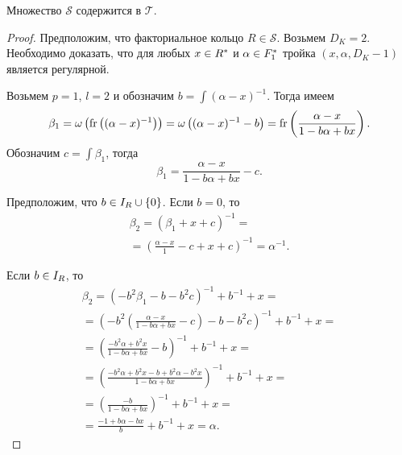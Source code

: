 \documentclass[_00_dissertation.tex]{subfiles}
\begin{document}
\begin{lemma}
    Множество $\mathcal{S}$ содержится в $\mathcal{T}$.
\end{lemma}
\begin{proof}
    Предположим, что факториальное кольцо $R \in \mathcal{S}$.
    Возьмем $D_K = 2$.
    Необходимо доказать, что для любых $x \in R^{*}$ и $\alpha \in F_1^{*}$ тройка $(x, \alpha, D_K-1)$ является регулярной.
    
    Возьмем $p = 1$, $l = 2$ и обозначим $b = \int{(\alpha - x)^{-1}}$.
    Тогда имеем
    \begin{equation*}
        \beta_1 = \omega\left(
            \textrm{fr}\left((\alpha - x)^{-1}\right)
        \right) = \omega\left(
            (\alpha - x)^{-1} - b
        \right) = \textrm{fr}\left(\frac{\alpha - x}{1 - b\alpha + bx}\right).
    \end{equation*}
    Обозначим $c = \int{\beta_1}$, тогда
    \begin{equation*}
        \beta_1 = \frac{\alpha - x}{1 - b\alpha + bx} - c.
    \end{equation*}
    
    Предположим, что $b \in I_{R} \cup \{0\}$.
    Если $b = 0$, то
    \begin{equation*}
        \begin{split}
            \beta_2 = \left(
                \beta_1 + x + c
            \right)^{-1} = \\
            = \left(
                \frac{\alpha - x}{1} - c + x + c
            \right)^{-1} = \alpha^{-1}.
        \end{split}
    \end{equation*}

    Если $b \in I_{R}$, то
    \begin{equation*}
        \begin{split}
            \beta_2 = \left(
                -b^2 \beta_1 - b - b^2 c
            \right)^{-1} + b^{-1} + x = \\
            = \left(
                -b^2 \left(
                    \frac{\alpha - x}{1 - b\alpha + bx} - c
                \right) - b - b^2 c
            \right)^{-1} + b^{-1} + x = \\
            = \left(
                \frac{-b^2\alpha + b^2x}{1 - b\alpha + bx} - b
            \right)^{-1} + b^{-1} + x = \\
            = \left(
                \frac{-b^2\alpha + b^2x - b + b^2\alpha - b^2x}{1 - b\alpha + bx}
            \right)^{-1} + b^{-1} + x = \\
            = \left(
                \frac{- b}{1 - b\alpha + bx}
            \right)^{-1} + b^{-1} + x = \\
            = \frac{-1 + b\alpha - bx}{b} + b^{-1} + x = \alpha.
        \end{split}
    \end{equation*}
    

\end{proof}
\end{document}
